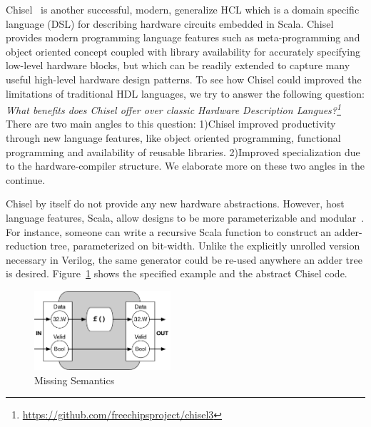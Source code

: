 Chisel~\cite{chisel} is another successful, modern, generalize HCL which is a domain specific language (DSL) for describing hardware circuits embedded in Scala.
Chisel provides modern programming language features such as meta-programming and object oriented concept coupled with library availability for accurately specifying low-level hardware blocks, but which can be readily extended to capture many useful high-level hardware design patterns.
To see how Chisel could improved the limitations of traditional HDL languages, we try to answer the following question:
\emph{What benefits does Chisel offer over classic Hardware Description Langues?\footnote{\url{https://github.com/freechipsproject/chisel3}}}
There are two main angles to this question: 1)Chisel improved productivity through new language features, like object oriented programming, functional programming and availability of reusable libraries. 2)Improved specialization due to the hardware-compiler structure. We elaborate more on these two angles in the continue.

Chisel by itself do not provide any new hardware abstractions. However, host language features, Scala, allow designs to be more parameterizable and modular~\cite{izraelevitz_2017_firrtl_reusability}.
For instance,  someone can write a recursive Scala function to construct an adder-reduction tree, parameterized on bit-width.
Unlike the explicitly unrolled version necessary in Verilog, the same generator could be re-used anywhere an adder tree is desired.
Figure~\ref{fig:filter} shows the specified example and the abstract Chisel code.

\begin{figure}[h]
    \centering
    \includegraphics[width=0.45\textwidth]{figures/Introduction/Filter.pdf}
    \caption{Missing Semantics}
    \label{fig:filter}
\end{figure}




